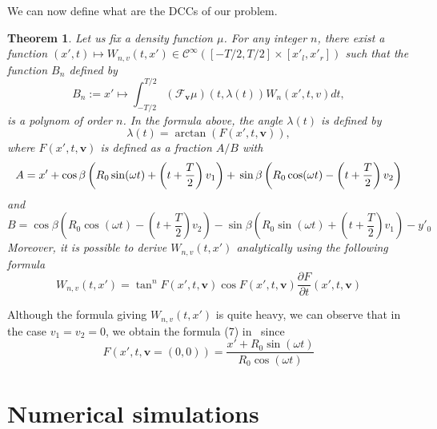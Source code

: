 \documentclass[9pt,technote]{IEEEtran}
\numberwithin{equation}{section}
\newcommand{\Cinf}{\mathcal{C}^{\infty}}
\newcommand{\bv}{\mathbf{v}}
\newcommand{\Tbv}{\mathcal{F}_{\mathbf{v}}}
\newtheorem{theorem}{Theorem}
\begin{document}
We can now define what are the DCCs of our problem.
\begin{theorem}
Let us fix a density function $\mu$. For any integer $n$, there exist a function $(x',t)\mapsto W_{n,v}(t,x') \in \Cinf \left( [-T/2,T/2] \times [x'_l,x'_r] \right)$ such that the function $B_n$ defined by
\begin{equation}
	B_n := x' \mapsto \int_{-T/2}^{T/2} \left( \Tbv \mu \right)\left( t,\lambda(t) \right) W_n(x',t,v) dt,
\label{eq:DCC}
\end{equation}
is a polynom of order $n$. In the formula above, the angle $\lambda(t)$ is defined by
\begin{equation}
	\lambda(t) = \arctan \left( F(x',t,\bv) \right),
\end{equation}
where $F(x',t,\bv)$ is defined as a fraction $A/B$ with
\begin{dmath}
	A = x' + \cos \beta \left( R_0 \sin(\omega t) + \left( t + \frac{T}{2} \right)v_1 \right) + \\
	\sin \beta \left( R_0 \cos(\omega t) - \left( t + \frac{T}{2} \right)v_2 \right)
\end{dmath}
and
\begin{dmath}
	B = \cos \beta \left( R_0 \cos(\omega t) - \left( t + \frac{T}{2} \right)v_2 \right) - \sin \beta \left( R_0 \sin(\omega t) + \left( t + \frac{T}{2} \right)v_1 \right) - y'_0 
\end{dmath}
Moreover, it is possible to derive $W_{n,v}(t,x')$ analytically using the following formula
\begin{equation}
	W_{n,v}(t,x') = \tan^n F(x',t,\bv) \cos F(x',t,\bv) \frac{\partial F}{\partial t} (x',t,\bv)
\end{equation}
\end{theorem}

Although the formula giving $W_{n,v}(t,x')$ is quite heavy, we can observe that in the case $v_1=v_2=0$, we obtain the formula (7) in~\cite{clackdoyle2015consistency} since
\begin{equation}
	F \left( x',t,\bv = (0,0) \right) = \frac{x' + R_0 \sin(\omega t)}{R_0 \cos(\omega t)}
\end{equation}

\section{Numerical simulations}
\end{document}

